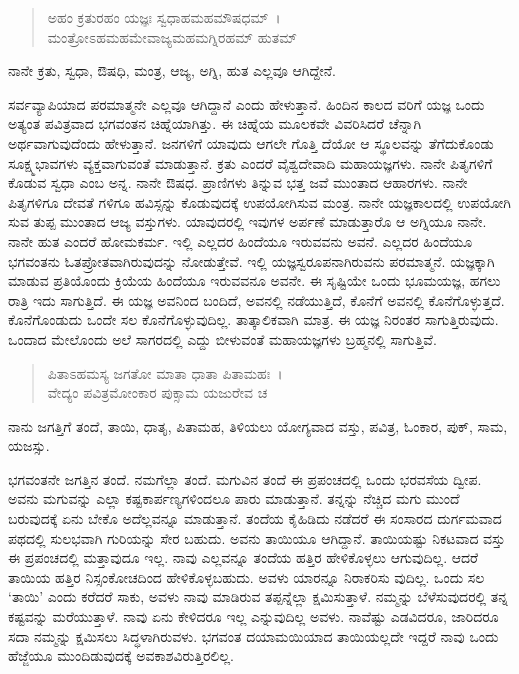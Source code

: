 \begin{verse}
ಅಹಂ ಕ್ರತುರಹಂ ಯಜ್ಞಃ ಸ್ವಧಾಹಮಹಮೌಷಧಮ್~।\\ಮಂತ್ರೋಽಹಮಹಮೇವಾಜ್ಯಮಹಮಗ್ನಿರಹಮ್ ಹುತಮ್ 
\end{verse}

{\small ನಾನೇ ಕ್ರತು, ಸ್ವಧಾ, ಔಷಧಿ, ಮಂತ್ರ, ಆಜ್ಯ, ಅಗ್ನಿ, ಹುತ ಎಲ್ಲವೂ ಆಗಿದ್ದೇನೆ.}

ಸರ್ವವ್ಯಾಪಿಯಾದ ಪರಮಾತ್ಮನೇ ಎಲ್ಲವೂ ಆಗಿದ್ದಾನೆ ಎಂದು ಹೇಳುತ್ತಾನೆ. ಹಿಂದಿನ ಕಾಲದ ವರಿಗೆ ಯಜ್ಞ ಒಂದು ಅತ್ಯಂತ ಪವಿತ್ರವಾದ ಭಗವಂತನ ಚಿಹ್ನೆಯಾಗಿತ್ತು. ಈ ಚಿಹ್ನೆಯ ಮೂಲಕವೇ ವಿವರಿಸಿದರೆ ಚೆನ್ನಾಗಿ ಅರ್ಥವಾಗುವುದೆಂದು ಹೇಳುತ್ತಾನೆ. ಜನಗಳಿಗೆ ಯಾವುದು ಆಗಲೇ ಗೊತ್ತಿ ದೆಯೋ ಆ ಸ್ಥೂಲವನ್ನು ತೆಗೆದುಕೊಂಡು ಸೂಕ್ಷ್ಮಭಾವಗಳು ವ್ಯಕ್ತವಾಗುವಂತೆ ಮಾಡುತ್ತಾನೆ. ಕ್ರತು ಎಂದರೆ ವೈಶ್ವದೇವಾದಿ ಮಹಾಯಜ್ಞಗಳು. ನಾನೇ ಪಿತೃಗಳಿಗೆ ಕೊಡುವ ಸ್ವಧಾ ಎಂಬ ಅನ್ನ. ನಾನೇ ಔಷಧ. ಪ್ರಾಣಿಗಳು ತಿನ್ನುವ ಭತ್ತ ಜವೆ ಮುಂತಾದ ಆಹಾರಗಳು. ನಾನೇ ಪಿತೃಗಳಿಗೂ ದೇವತೆ ಗಳಿಗೂ ಹವಿಸ್ಸನ್ನು ಕೊಡುವುದಕ್ಕೆ ಉಪಯೋಗಿಸುವ ಮಂತ್ರ. ನಾನೇ ಯಜ್ಞಕಾಲದಲ್ಲಿ ಉಪಯೋಗಿ ಸುವ ತುಪ್ಪ ಮುಂತಾದ ಆಜ್ಯ ವಸ್ತುಗಳು. ಯಾವುದರಲ್ಲಿ ಇವುಗಳ ಅರ್ಪಣೆ ಮಾಡುತ್ತಾರೊ ಆ ಅಗ್ನಿಯೂ ನಾನೇ. ನಾನೇ ಹುತ ಎಂದರೆ ಹೋಮಕರ್ಮ. ಇಲ್ಲಿ ಎಲ್ಲದರ ಹಿಂದೆಯೂ ಇರುವವನು ಅವನೆ. ಎಲ್ಲದರ ಹಿಂದೆಯೂ ಭಗವಂತನು ಓತಪ್ರೋತವಾಗಿರುವುದನ್ನು ನೋಡುತ್ತೇವೆ. ಇಲ್ಲಿ ಯಜ್ಞಸ್ವರೂಪನಾಗಿರುವನು ಪರಮಾತ್ಮನೆ. ಯಜ್ಞಕ್ಕಾಗಿ ಮಾಡುವ ಪ್ರತಿಯೊಂದು ಕ್ರಿಯೆಯ ಹಿಂದೆಯೂ ಇರುವವನೂ ಅವನೇ. ಈ ಸೃಷ್ಟಿಯೇ ಒಂದು ಭೂಮಯಜ್ಞ, ಹಗಲು ರಾತ್ರಿ ಇದು ಸಾಗುತ್ತಿದೆ. ಈ ಯಜ್ಞ ಅವನಿಂದ ಬಂದಿದೆ, ಅವನಲ್ಲಿ ನಡೆಯುತ್ತಿದೆ, ಕೊನೆಗೆ ಅವನಲ್ಲಿ ಕೊನೆಗೊಳ್ಳುತ್ತದೆ. ಕೊನೆಗೊಂಡುದು ಒಂದೇ ಸಲ ಕೊನೆಗೊಳ್ಳುವುದಿಲ್ಲ. ತಾತ್ಕಾಲಿಕವಾಗಿ ಮಾತ್ರ. ಈ ಯಜ್ಞ ನಿರಂತರ ಸಾಗುತ್ತಿರುವುದು. ಒಂದಾದ ಮೇಲೊಂದು ಅಲೆ ಸಾಗರದಲ್ಲಿ ಎದ್ದು ಬೀಳುವಂತೆ ಮಹಾಯಜ್ಞಗಳು ಬ್ರಹ್ಮನಲ್ಲಿ ಸಾಗುತ್ತಿವೆ.

\begin{verse}
ಪಿತಾಽಹಮಸ್ಯ ಜಗತೋ ಮಾತಾ ಧಾತಾ ಪಿತಾಮಹಃ~।\\ವೇದ್ಯಂ ಪವಿತ್ರಮೋಂಕಾರ ಪುಕ್ಸಾಮ ಯಜುರೇವ ಚ 
\end{verse}

{\small ನಾನು ಜಗತ್ತಿಗೆ ತಂದೆ, ತಾಯಿ, ಧಾತೃ, ಪಿತಾಮಹ, ತಿಳಿಯಲು ಯೋಗ್ಯವಾದ ವಸ್ತು, ಪವಿತ್ರ, ಓಂಕಾರ, ಪುಕ್, ಸಾಮ, ಯಜಸ್ಸು.}

ಭಗವಂತನೇ ಜಗತ್ತಿನ ತಂದೆ. ನಮಗೆಲ್ಲಾ ತಂದೆ. ಮಗುವಿನ ತಂದೆ ಈ ಪ್ರಪಂಚದಲ್ಲಿ ಒಂದು ಭರವಸೆಯ ದ್ವೀಪ. ಅವನು ಮಗುವನ್ನು ಎಲ್ಲಾ ಕಷ್ಟಕಾರ್ಪಣ್ಯಗಳಿಂದಲೂ ಪಾರು ಮಾಡುತ್ತಾನೆ. ತನ್ನನ್ನು ನೆಚ್ಚಿದ ಮಗು ಮುಂದೆ ಬರುವುದಕ್ಕೆ ಏನು ಬೇಕೊ ಅದೆಲ್ಲವನ್ನೂ ಮಾಡುತ್ತಾನೆ. ತಂದೆಯ ಕೈಹಿಡಿದು ನಡೆದರೆ ಈ ಸಂಸಾರದ ದುರ್ಗಮವಾದ ಪಥದಲ್ಲಿ ಸುಲಭವಾಗಿ ಗುರಿಯನ್ನು ಸೇರ ಬಹುದು. ಅವನು ತಾಯಿಯೂ ಆಗಿದ್ದಾನೆ. ತಾಯಿಯಷ್ಟು ನಿಕಟವಾದ ವಸ್ತು ಈ ಪ್ರಪಂಚದಲ್ಲಿ ಮತ್ತಾವುದೂ ಇಲ್ಲ. ನಾವು ಎಲ್ಲವನ್ನೂ ತಂದೆಯ ಹತ್ತಿರ ಹೇಳಿಕೊಳ್ಳಲು ಆಗುವುದಿಲ್ಲ. ಆದರೆ ತಾಯಿಯ ಹತ್ತಿರ ನಿಸ್ಸಂಕೋಚದಿಂದ ಹೇಳಿಕೊಳ್ಳಬಹುದು. ಅವಳು ಯಾರನ್ನೂ ನಿರಾಕರಿಸು ವುದಿಲ್ಲ. ಒಂದು ಸಲ ‘ತಾಯಿ’ ಎಂದು ಕರೆದರೆ ಸಾಕು, ಅವಳು ನಾವು ಮಾಡಿರುವ ತಪ್ಪನ್ನೆಲ್ಲಾ ಕ್ಷಮಿಸುತ್ತಾಳೆ. ನಮ್ಮನ್ನು ಬೆಳೆಸುವುದರಲ್ಲಿ ತನ್ನ ಕಷ್ಟವನ್ನು ಮರೆಯುತ್ತಾಳೆ. ನಾವು ಏನು ಕೇಳಿದರೂ ಇಲ್ಲ ಎನ್ನುವುದಿಲ್ಲ ಅವಳು. ನಾವೆಷ್ಟು ಎಡವಿದರೂ, ಜಾರಿದರೂ ಸದಾ ನಮ್ಮನ್ನು ಕ್ಷಮಿಸಲು ಸಿದ್ಧಳಾಗಿರುವಳು. ಭಗವಂತ ದಯಾಮಯಿಯಾದ ತಾಯಿಯಲ್ಲದೇ ಇದ್ದರೆ ನಾವು ಒಂದು ಹೆಜ್ಜೆಯೂ ಮುಂದಿಡುವುದಕ್ಕೆ ಅವಕಾಶವಿರುತ್ತಿರಲಿಲ್ಲ.

